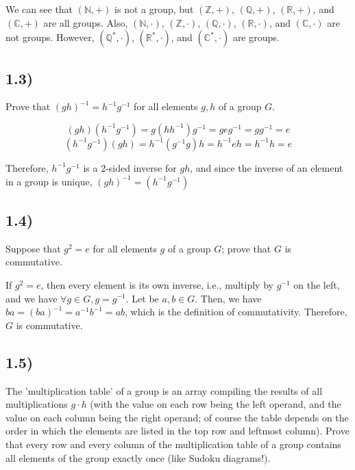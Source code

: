 \documentclass[12pt, letterpaper, twoside]{report}
\begin{document}
We can see that $(\mathbb{N}, +)$ is not a group, but $(\mathbb{Z}, +)$, $(\mathbb{Q}, +)$, $(\mathbb{R}, +)$, and $(\mathbb{C}, +)$ are all groups. Also, $(\mathbb{N}, \cdot)$, $(\mathbb{Z}, \cdot)$, $(\mathbb{Q}, \cdot)$, $(\mathbb{R}, \cdot)$, and $(\mathbb{C}, \cdot)$ are not groups. However, $(\mathbb{Q}^*, \cdot)$, $(\mathbb{R}^*, \cdot)$, and $(\mathbb{C}^*, \cdot)$ are groups.



\subsection*{1.3)}

Prove that $(gh)^{-1} = h^{-1} g^{-1}$ for all elements $g, h$ of a group $G$.

$$(gh)(h^{-1}g^{-1}) = g(hh^{-1})g^{-1} = geg^{-1} = gg^{-1} = e$$
$$(h^{-1}g^{-1})(gh) = h^{-1}(g^{-1}g)h = h^{-1}eh = h^{-1}h = e$$

Therefore, $h^{-1} g^{-1}$ is a 2-sided inverse for $gh$, and since the inverse of an element in a group is unique, $(gh)^{-1} = (h^{-1}g^{-1})$



\subsection*{1.4)}

Suppose that $g^2 = e$ for all elements $g$ of a group $G$; prove that $G$ is commutative.

If $g^2 = e$, then every element is its own inverse, i.e., multiply by $g^{-1}$ on the left, and we have $\forall g \in G, g = g^{-1}$. Let be $a, b \in G$. Then, we have $ba = (ba)^{-1} = a^{-1}b^{-1} = ab$, which is the definition of commutativity. Therefore, $G$ is commutative.



\subsection*{1.5)}

The 'multiplication table' of a group is an array compiling the results of all multiplications $g \cdot h$ (with the value on each row being the left operand, and the value on each column being the right operand; of course the table depends on the order in which the elements are listed in the top row and leftmost column). Prove that every row and every column of the multiplication table of a group contains all elements of the group exactly once (like Sudoku diagrams!).
\end{document}
